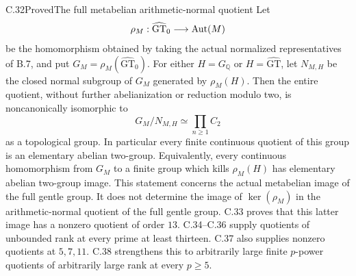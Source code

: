 \begin{statement}{C.32}{Proved}{The full metabelian arithmetic-normal quotient}
Let
\[
 \rho_M:\widehat{\mathrm{GT}}_0\longrightarrow\operatorname{Aut}(M)
\]
be the homomorphism obtained by taking the actual normalized
representatives of B.7, and put
$G_M=\rho_M(\widehat{\mathrm{GT}}_0)$.
For either $H=G_{\mathbb Q}$ or
$H=\widehat{\mathrm{GT}}$, let $N_{M,H}$ be the closed normal
subgroup of $G_M$ generated by $\rho_M(H)$.
Then the entire quotient, without further abelianization or
reduction modulo two, is noncanonically isomorphic to
\[
                G_M/N_{M,H}\simeq\prod_{n\geq1}C_2
                \tag{C.32.1}
\]
as a topological group.
In particular every finite continuous quotient of this group is
an elementary abelian two-group. Equivalently, every continuous
homomorphism from $G_M$ to a finite group which kills $\rho_M(H)$
has elementary abelian two-group image.
This statement concerns the actual metabelian image of the full
gentle group. It does not determine the image of $\ker(\rho_M)$ in the
arithmetic-normal quotient of the full gentle group.
C.33 proves that this latter image has a nonzero quotient of order
$13$.
C.34--C.36 supply quotients of unbounded rank at every prime
at least thirteen.
C.37 also supplies nonzero quotients at $5,7,11$.
C.38 strengthens this to arbitrarily large finite $p$-power
quotients of arbitrarily large rank at every $p\geq5$.
\end{statement}
